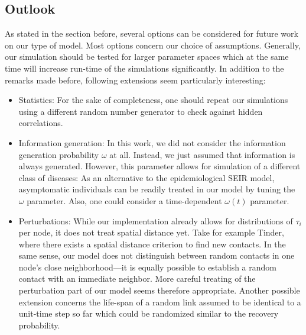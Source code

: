 \documentclass[11pt]{article}
\begin{document}
\subsection*{Outlook}

As stated in the section before, several options can be considered for future work on our type of model. Most options concern our choice of assumptions. Generally, our simulation should be tested for larger parameter spaces which at the same time will increase run-time of the simulations significantly. In addition to the remarks made before, following extensions seem particularly interesting:

\begin{itemize}
  \item Statistics: For the sake of completeness, one should repeat our simulations using a different random number generator to check against hidden correlations.
  \item Information generation: In this work, we did not consider the information generation probability $\omega$ at all. Instead, we just assumed that information is always generated. However, this parameter allows for simulation of a different class of diseases: As an alternative to the epidemiological SEIR model, asymptomatic individuals can be readily treated in our model by tuning the $\omega$ parameter. Also, one could consider a time-dependent $\omega(t)$ parameter.
  \item Perturbations: While our implementation already allows for distributions of $\tau_i$ per node, it does not treat spatial distance yet. Take for example Tinder, where there exists a spatial distance criterion to find new contacts. In the same sense, our model does not distinguish between random contacts in one node's close neighborhood---it is equally possible to establish a random contact with an immediate neighbor. More careful treating of the perturbation part of our model seems therefore appropriate. Another possible extension concerns the life-span of a random link assumed to be identical to a unit-time step so far which could be randomized similar to the recovery probability.
\end{itemize}




\end{document}
